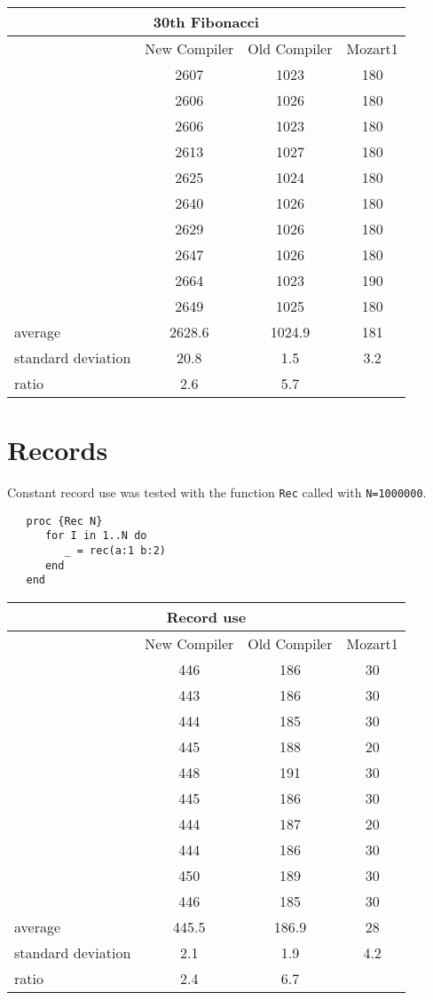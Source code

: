 \documentclass[a4paper]{memoir}
\begin{document}
\begin{appendices}
\begin{center}
\begin{tabular} {| l c c c|}
\hline
\multicolumn{4}{|c|}{\textbf{30th Fibonacci}} \\ \hline
  & New Compiler& Old Compiler & Mozart1 \\
  &         2607&  1023&  180\\ 
  &         2606&  1026&  180\\
  &         2606&  1023&  180\\
  &         2613&  1027&  180\\
  &         2625&  1024&  180\\
  &         2640&  1026&  180\\
  &         2629&  1026&  180\\
  &         2647&  1026&  180\\
  &         2664&  1023&  190\\
  &         2649&  1025&  180\\ \hline
average& 2628.6&  1024.9&  181\\
standard deviation& 20.8&  1.5& 3.2\\
ratio& 2.6& 5.7 & \\
\hline
\end{tabular}
\end{center}

\section{Records}

Constant record use was tested with the function \lstinline!Rec! called with
\lstinline!N=1000000!.

\begin{lstlisting}
   proc {Rec N}
      for I in 1..N do
         _ = rec(a:1 b:2)
      end
   end
\end{lstlisting}

\begin{center}
\begin{tabular} {| l c c c|}
\hline
\multicolumn{4}{|c|}{\textbf{Record use}} \\ \hline
  & New Compiler& Old Compiler & Mozart1 \\
  &         446& 186& 30\\ 
  &         443& 186& 30\\
  &         444& 185& 30\\
  &         445& 188& 20\\
  &         448& 191& 30\\
  &         445& 186& 30\\
  &         444& 187& 20\\
  &         444& 186& 30\\
  &         450& 189& 30\\
  &         446& 185& 30\\ \hline
average& 445.5& 186.9  & 28\\
standard deviation& 2.1 & 1.9 & 4.2\\
ratio &  2.4&  6.7& \\
\hline
\end{tabular}
\end{center}


\end{appendices}
\end{document}
